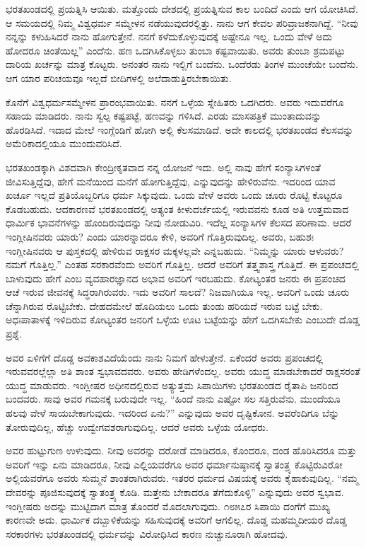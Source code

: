 ಭರತಖಂಡದಲ್ಲಿ ಪ್ರಯತ್ನಿಸಿ ಆಯಿತು. ಮತ್ತೊಂದು ದೇಶದಲ್ಲಿ ಪ್ರಯತ್ನಿಸುವ ಕಾಲ ಬಂದಿದೆ ಎಂದು ಆಗ ಯೋಚಿಸಿದೆ. ಆ ಸಮಯದಲ್ಲಿ ನಿಮ್ಮ ವಿಶ್ವಧರ್ಮ ಸಮ್ಮೇಳನ ನಡೆಯುವುದರಲ್ಲಿತ್ತು. ನಾನು ಆಗ ಕೇವಲ ಪರಿವ್ರಾಜಕನಾಗಿದ್ದೆ. “ನೀವು ನನ್ನನ್ನು ಕಳುಹಿಸಿದರೆ ನಾನು ಹೋಗುತ್ತೇನೆ. ನನಗೆ ಕಳೆದುಕೊಳ್ಳುವುದಕ್ಕೆ ಅಷ್ಟೇನೂ ಇಲ್ಲ. ಒಂದು ವೇಳೆ ಅದು ಹೋದರೂ ಚಿಂತೆಯಿಲ್ಲ” ಎಂದೆನು. ಹಣ ಒದಗಿಸಿಕೊಳ್ಳಲು ತುಂಬಾ ಕಷ್ಟವಾಯಿತು. ಅವರು ತುಂಬಾ ಶ್ರಮಪಟ್ಟು ದಾರಿಯ ಖರ್ಚನ್ನು ಮಾತ್ರ ಕೊಟ್ಟರು. ಅನಂತರ ನಾನು ಇಲ್ಲಿಗೆ ಬಂದೆನು. ಒಂದೆರಡು ತಿಂಗಳ ಮುಂಚೆಯೇ ಬಂದೆನು. ಆಗ ಯಾರ ಪರಿಚಯವೂ ಇಲ್ಲದೆ ಬೀದಿಗಳಲ್ಲಿ ಅಲೆದಾಡುತ್ತಿರಬೇಕಾಯಿತು.

ಕೊನೆಗೆ ವಿಶ್ವಧರ್ಮಸಮ್ಮೇಳನ ಪ್ರಾರಂಭವಾಯಿತು. ನನಗೆ ಒಳ್ಳೆಯ ಸ್ನೇಹಿತರು ಒದಗಿದರು. ಅವರು ಇದುವರೆಗೂ ಸಹಾಯ ಮಾಡಿದರು. ನಾನು ಸ್ವಲ್ಪ ಕಷ್ಟಪಟ್ಟೆ, ಹಣವನ್ನು ಗಳಿಸಿದೆ. ಎರಡು ಮಾಸಪತ್ರಿಕೆ ಮುಂತಾದುವನ್ನು ಹೊರಡಿಸಿದೆ. ಇದಾದ ಮೇಲೆ ಇಂಗ್ಲೆಂಡಿಗೆ ಹೋಗಿ ಅಲ್ಲಿ ಕೆಲಸಮಾಡಿದೆ. ಅದೇ ಕಾಲದಲ್ಲಿ ಭರತಖಂಡದ ಕೆಲಸವನ್ನು ಅಮೆರಿಕಾದಲ್ಲಿಯೂ ಮುಂದುವರಿಸಿದೆ.

ಭರತಖಂಡಕ್ಕಾಗಿ ವಿಶದವಾಗಿ ಕೇಂದ್ರೀಕೃತವಾದ ನನ್ನ ಯೋಜನೆ ಇದು. ಅಲ್ಲಿ ನಾವು ಹೇಗೆ ಸಂನ್ಯಾಸಿಗಳಂತೆ ಜೀವಿಸುತ್ತಿದ್ದೆವು, ಹೇಗೆ ಮನೆಯಿಂದ ಮನೆಗೆ ಹೋಗುತ್ತಿದ್ದೆವು, ಎನ್ನುವುದನ್ನು ಹೇಳಿರುವೆನು. ಇದರಿಂದ ಯಾವ ಖರ್ಚೂ ಇಲ್ಲದೆ ಪ್ರತಿಯೊಬ್ಬರಿಗೂ ಧರ್ಮ ಸಿಕ್ಕುವುದು. ಒಂದು ವೇಳೆ ಅವರು ಒಂದು ಚೂರು ರೊಟ್ಟಿ ಕೊಟ್ಟರೂ ಕೊಡಬಹುದು. ಆದಕಾರಣವೆ ಭರತಖಂಡದಲ್ಲಿ ಅತ್ಯಂತ ಕೀಳುದರ್ಜೆಯಲ್ಲಿ ಇರುವವನು ಕೂಡ ಅತಿ ಉತ್ತಮವಾದ ಧಾರ್ಮಿಕ ಭಾವನೆಗಳನ್ನು ಹೊಂದಿರುವುದನ್ನು ನೀವು ನೋಡುವಿರಿ. ಇದೆಲ್ಲ ಸಂನ್ಯಾಸಿಗಳ ಕೆಲಸದ ಪರಿಣಾಮ. ಆದರೆ ಇಂಗ್ಲೀಷಿನವರು ಯಾರು? ಎಂದು ಯಾರನ್ನಾದರೂ ಕೇಳಿ, ಅವರಿಗೆ ಗೊತ್ತಿರುವುದಿಲ್ಲ. ಅವರು, ಬಹುಶಃ ಇಂಗ್ಲೀಷಿನವರು ಆ ಪುಸ್ತಕದಲ್ಲಿ ಹೇಳಿರುವ ರಾಕ್ಷಸರ ಮಕ್ಕಳಲ್ಲವೇ ಎನ್ನಬಹುದು. “ನಿಮ್ಮನ್ನು ಯಾರು ಆಳುವರು? ನಮಗೆ ಗೊತ್ತಿಲ್ಲ.” ಎಂತಹ ಸರಕಾರವೆಂದು ಅವರಿಗೆ ಗೊತ್ತಿಲ್ಲ. ಆದರೆ ಅವರಿಗೆ ತತ್ತ್ವಶಾಸ್ತ್ರ ಗೊತ್ತಿದೆ. ಈ ಪ್ರಪಂಚದಲ್ಲಿ ಬಾಳುವುದು ಹೇಗೆ ಎಂಬ ವ್ಯವಹಾರಜ್ಞಾನದ ಅಭಾವ ಅವರಿಗೆ ಇರಬಹುದು. ಕೋಟ್ಯಂತರ ಜನರು ಈ ಪ್ರಪಂಚದ ಆಚೆ ಇರುವ ಜೀವನಕ್ಕೆ ಸಿದ್ಧರಾಗಿರುವರು. ಇದು ಅವರಿಗೆ ಸಾಲದೆ? ನಿಜವಾಗಿಯೂ ಇಲ್ಲ. ಅವರಿಗೆ ಒಂದು ಚೂರು ಚೆನ್ನಾಗಿರುವ ರೊಟ್ಟಿಬೇಕು. ದೇಹದಮೇಲೆ ಹೊದಿಯಲು ಒಂದು ತುಂಡು ಹರಿಯದೆ ಇರುವ ಬಟ್ಟೆ ಬೇಕು. ಅಧಃಪಾತಾಳಕ್ಕೆ ಇಳಿದಿರುವ ಕೋಟ್ಯಂತರ ಜನರಿಗೆ ಒಳ್ಳೆಯ ಊಟ ಬಟ್ಟೆಯನ್ನು ಹೇಗೆ ಒದಗಿಸಬೇಕು ಎಂಬುದೇ ದೊಡ್ಡ ಪ್ರಶ್ನೆ.

ಅವರ ಏಳಿಗೆಗೆ ದೊಡ್ಡ ಅವಕಾಶವಿದೆಯೆಂದು ನಾನು ನಿಮಗೆ ಹೇಳುತ್ತೇನೆ. ಏಕೆಂದರೆ ಅವರು ಪ್ರಪಂಚದಲ್ಲಿ ಇರುವವರಲ್ಲೆಲ್ಲಾ ಅತಿ ಶಾಂತ ಸ್ವಭಾವದವರು. ಅವರು ಹೇಡಿಗಳೆಂದಲ್ಲ. ಅವರು ಯುದ್ಧ ಮಾಡಬೇಕಾದರೆ ರಾಕ್ಷಸರಂತೆ ಯುದ್ಧ ಮಾಡುವರು. ಇಂಗ್ಲೀಷರ ಅಧೀನದಲ್ಲಿರುವ ಅತ್ಯುತ್ತಮ ಸಿಪಾಯಿಗಳು ಭರತಖಂಡದ ರೈತಾಪಿ ಜನರಿಂದ ಬಂದವರು. ಸಾವು ಅವರ ಗಮನಕ್ಕೆ ಬರುವುದೇ ಇಲ್ಲ. “ಹಿಂದೆ ನಾನು ಎಷ್ಟೋ ಸಲ ಸತ್ತಿರುವೆನು. ಮುಂದೆಯೂ ಹಲವು ವೇಳೆ ಸಾಯಬೇಕಾಗುವುದು. ಇದರಿಂದ ಏನು?” ಎನ್ನುವುದು ಅವರ ದೃಷ್ಟಿಕೋನ. ಅವರೆಂದಿಗೂ ಬೆನ್ನು ತೋರುವುದಿಲ್ಲ, ಹೆಚ್ಚು ಉದ್ವೇಗವಶರಾಗುವುದಿಲ್ಲ. ಆದರೆ ಅವರು ಒಳ್ಳೆಯ ಯೋಧರು.

\newpage

ಅವರ ಹುಟ್ಟುಗುಣ ಉಳುವುದು. ನೀವು ಅವರನ್ನು ದರೋಡೆ ಮಾಡಿದರೂ, ಕೊಂದರೂ, ದಂಡ ಹೊರಿಸಿದರೂ ಮತ್ತು ಅವರಿಗೆ ಇನ್ನು ಏನು ಮಾಡಿದರೂ, ನೀವು ಎಲ್ಲಿಯವರೆಗೂ ಅವರ ಧರ್ಮಾನುಷ್ಠಾನಕ್ಕೆ ಸ್ವಾತಂತ್ರ್ಯ ಕೊಟ್ಟಿರುವಿರೋ ಅಲ್ಲಿಯವರೆಗೂ ಅವರು ಸುಮ್ಮನೆ ಶಾಂತರಾಗಿರುವರು. ಇತರರ ಧರ್ಮದ ವಿಷಯಕ್ಕೆ ಅವರು ಕೈಹಾಕುವುದಿಲ್ಲ. “ನಮ್ಮ ದೇವರನ್ನು ಪೂಜಿಸುವುದಕ್ಕೆ ಸ್ವಾತಂತ್ರ್ಯ ಕೊಡಿ. ಮತ್ತೇನು ಬೇಕಾದರೂ ತೆಗೆದುಕೊಳ್ಳಿ” ಎನ್ನುವುದು ಅವರ ಸ್ವಭಾವ. ಇಂಗ್ಲೀಷರು ಅದನ್ನು ಮುಟ್ಟಿದಾಗ ಮಾತ್ರ ತೊಂದರೆ ಮೊದಲಾಗುವುದು. ೧೮೫೭ರ ಸಿಪಾಯಿ ದಂಗೆಗೆ ಮುಖ್ಯ ಕಾರಣವೇ ಅದು. ಧಾರ್ಮಿಕ ದಬ್ಬಾಳಿಕೆಯನ್ನು ಸಹಿಸುವುದಕ್ಕೆ ಅವರಿಗೆ ಆಗಲಿಲ್ಲ. ದೊಡ್ಡ ಮಹಮ್ಮದೀಯರ ದೊಡ್ಡ ಸರಕಾರಗಳು ಭರತಖಂಡದಲ್ಲಿ ಧರ್ಮವನ್ನು ವಿರೋಧಿಸಿದ ಕಾರಣ ನುಚ್ಚುನೂರಾಗಿ ಹೋದವು.

